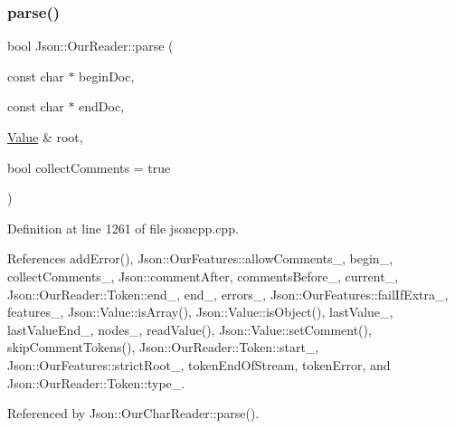 \mbox{\label{class_json_1_1_our_reader_aba4f8749aab7f02ec17f107e392caf80}} 
\subsubsection{\texorpdfstring{parse()}{parse()}}
{\footnotesize\ttfamily bool Json\+::\+Our\+Reader\+::parse (\begin{DoxyParamCaption}\item[{const char $\ast$}]{begin\+Doc,  }\item[{const char $\ast$}]{end\+Doc,  }\item[{\hyperlink{class_json_1_1_value}{Value} \&}]{root,  }\item[{bool}]{collect\+Comments = {\ttfamily true} }\end{DoxyParamCaption})}



Definition at line 1261 of file jsoncpp.\+cpp.



References add\+Error(), Json\+::\+Our\+Features\+::allow\+Comments\+\_\+, begin\+\_\+, collect\+Comments\+\_\+, Json\+::comment\+After, comments\+Before\+\_\+, current\+\_\+, Json\+::\+Our\+Reader\+::\+Token\+::end\+\_\+, end\+\_\+, errors\+\_\+, Json\+::\+Our\+Features\+::fail\+If\+Extra\+\_\+, features\+\_\+, Json\+::\+Value\+::is\+Array(), Json\+::\+Value\+::is\+Object(), last\+Value\+\_\+, last\+Value\+End\+\_\+, nodes\+\_\+, read\+Value(), Json\+::\+Value\+::set\+Comment(), skip\+Comment\+Tokens(), Json\+::\+Our\+Reader\+::\+Token\+::start\+\_\+, Json\+::\+Our\+Features\+::strict\+Root\+\_\+, token\+End\+Of\+Stream, token\+Error, and Json\+::\+Our\+Reader\+::\+Token\+::type\+\_\+.



Referenced by Json\+::\+Our\+Char\+Reader\+::parse().


